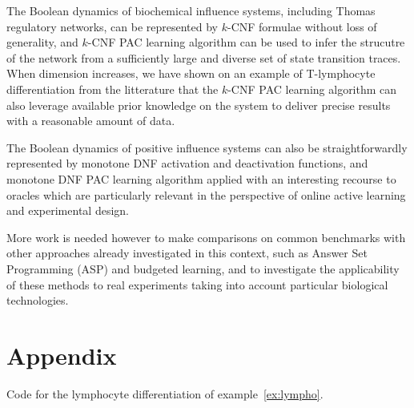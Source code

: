 \documentclass{llncs}
\begin{document}
The Boolean dynamics of biochemical influence systems, including Thomas regulatory networks, can be represented by $k$-CNF formulae without loss of generality,
and $k$-CNF PAC learning algorithm can be used to infer the strucutre of the network from
a sufficiently large and diverse set of state transition traces.
When dimension increases, we have shown on an example of T-lymphocyte differentiation from the litterature
that the $k$-CNF PAC learning algorithm can also leverage available
prior knowledge on the system to deliver precise results with a reasonable
amount of data.

The Boolean dynamics of positive influence systems can also be straightforwardly represented by monotone DNF activation and deactivation functions,
and monotone DNF PAC learning algorithm applied with an interesting recourse to oracles 
which are particularly relevant in the perspective of online active learning and experimental design.

More work is needed however to make comparisons on common benchmarks
with  other approaches already investigated in this context, such as Answer Set Programming (ASP) and budgeted learning,
and to investigate the applicability of these methods to real experiments taking into account particular biological technologies.



\newpage
\section*{Appendix}
\begin{listfig}[H]

\caption{Code for the lymphocyte differentiation of example~\ref{ex:lympho}.\label{bool-lympho}}
\end{listfig}
\end{document}
